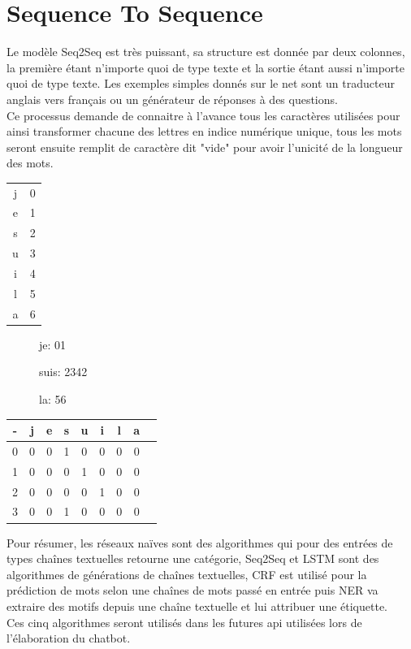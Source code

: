 \section{Sequence To Sequence}
Le modèle Seq2Seq est très puissant, sa structure est donnée par deux colonnes, la première étant n'importe quoi de type texte et la sortie étant aussi n'importe quoi de type texte. Les exemples simples donnés sur le net sont un traducteur anglais vers français ou un générateur de réponses à des questions.\\
\linebreak
Ce processus demande de connaitre à l'avance tous les caractères utilisées pour ainsi transformer chacune des lettres en indice numérique unique, tous les mots seront ensuite remplit de caractère dit "vide" pour avoir l'unicité de la longueur des mots.\\

\begin{multicols}{3}
\begin{tabular}{c|c}
j & 0\\
e & 1\\
s & 2\\
u & 3\\
i & 4\\
l & 5\\
a & 6\\
\end{tabular}
\begin{description}
\item[] je: 01
\item[] suis: 2342
\item[] la: 56
\end{description}
\begin{tabular}{c|cccccccc}
- & j & e & s & u & i & l & a\\
\hline
0 & 0 & 0 & 1 & 0 & 0 & 0 & 0\\
1 & 0 & 0 & 0 & 1 & 0 & 0 & 0\\
2 & 0 & 0 & 0 & 0 & 1 & 0 & 0\\
3 & 0 & 0 & 1 & 0 & 0 & 0 & 0\\
\end{tabular}
\end{multicols}

\pagebreak

Pour résumer, les réseaux naïves sont des algorithmes qui pour des entrées de types chaînes textuelles retourne une catégorie, Seq2Seq et LSTM sont des algorithmes de générations de chaînes textuelles, CRF est utilisé pour la prédiction de mots selon une chaînes de mots passé en entrée puis NER va extraire des motifs depuis une chaîne textuelle et lui attribuer une étiquette.\\
\linebreak
Ces cinq algorithmes seront utilisés dans les futures api utilisées lors de l'élaboration du chatbot.\\
\pagebreak


